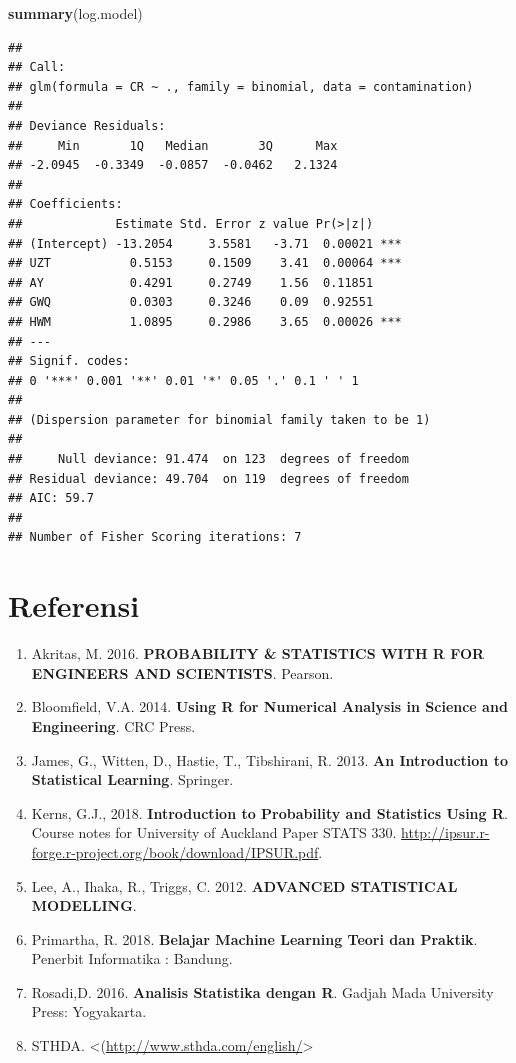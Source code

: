 \documentclass[]{book}
\newenvironment{Shaded}{\begin{snugshade}}{\end{snugshade}}
\newcommand{\KeywordTok}[1]{\textcolor[rgb]{0.13,0.29,0.53}{\textbf{#1}}}
\newcommand{\NormalTok}[1]{#1}
\providecommand{\tightlist}{%
  \setlength{\itemsep}{0pt}\setlength{\parskip}{0pt}}
\theoremstyle{definition}
\theoremstyle{definition}
\theoremstyle{definition}
\theoremstyle{remark}
\begin{document}
\begin{Shaded}
\begin{Highlighting}[]
\KeywordTok{summary}\NormalTok{(log.model)}
\end{Highlighting}
\end{Shaded}

\begin{verbatim}
## 
## Call:
## glm(formula = CR ~ ., family = binomial, data = contamination)
## 
## Deviance Residuals: 
##     Min       1Q   Median       3Q      Max  
## -2.0945  -0.3349  -0.0857  -0.0462   2.1324  
## 
## Coefficients:
##             Estimate Std. Error z value Pr(>|z|)    
## (Intercept) -13.2054     3.5581   -3.71  0.00021 ***
## UZT           0.5153     0.1509    3.41  0.00064 ***
## AY            0.4291     0.2749    1.56  0.11851    
## GWQ           0.0303     0.3246    0.09  0.92551    
## HWM           1.0895     0.2986    3.65  0.00026 ***
## ---
## Signif. codes:  
## 0 '***' 0.001 '**' 0.01 '*' 0.05 '.' 0.1 ' ' 1
## 
## (Dispersion parameter for binomial family taken to be 1)
## 
##     Null deviance: 91.474  on 123  degrees of freedom
## Residual deviance: 49.704  on 119  degrees of freedom
## AIC: 59.7
## 
## Number of Fisher Scoring iterations: 7
\end{verbatim}

\hypertarget{referensi-11}{%
\section{Referensi}\label{referensi-11}}

\begin{enumerate}
\def\labelenumi{\arabic{enumi}.}
\tightlist
\item
  Akritas, M. 2016. \textbf{PROBABILITY \& STATISTICS WITH R FOR ENGINEERS AND SCIENTISTS}. Pearson.
\item
  Bloomfield, V.A. 2014. \textbf{Using R for Numerical Analysis in Science and Engineering}. CRC Press.
\item
  James, G., Witten, D., Hastie, T., Tibshirani, R. 2013. \textbf{An Introduction to Statistical Learning}. Springer.
\item
  Kerns, G.J., 2018. \textbf{Introduction to Probability and Statistics Using R}. Course notes for University of Auckland Paper STATS 330. \url{http://ipsur.r-forge.r-project.org/book/download/IPSUR.pdf}.
\item
  Lee, A., Ihaka, R., Triggs, C. 2012. \textbf{ADVANCED STATISTICAL MODELLING}.
\item
  Primartha, R. 2018. \textbf{Belajar Machine Learning Teori dan Praktik}. Penerbit Informatika : Bandung.
\item
  Rosadi,D. 2016. \textbf{Analisis Statistika dengan R}. Gadjah Mada University Press: Yogyakarta.
\item
  STHDA. \textless{}(\url{http://www.sthda.com/english/}\textgreater{}
\end{enumerate}


\end{document}
